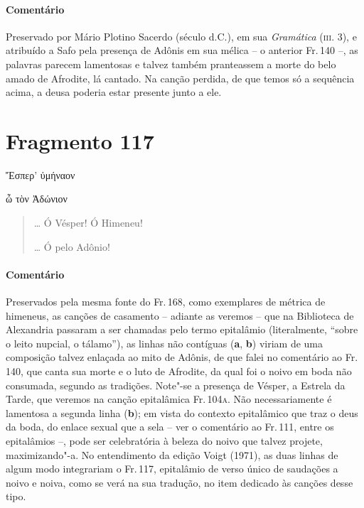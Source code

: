 {\paragraph{Comentário} Preservado por Mário Plotino Sacerdo (século  d.C.), em sua
\emph{Gramática} (\textsc{iii}. 3), e atribuído a Safo pela presença de Adônis em
sua mélica -- o anterior Fr.\,140 --, as palavras parecem lamentosas e
talvez também pranteassem a morte do belo amado de Afrodite, lá cantado. Na canção perdida, de que temos só a sequência acima, a deusa poderia estar presente junto a ele.}


\pagebreak
\section{Fragmento 117}

\begin{gkverse}
 Ἔσπερ’ ὐμήναον

\ast\quad\ast\quad\ast

ὦ τὸν Ἀδώνιον
\end{gkverse}

\begin{verse}
\ldots{} Ó Vésper! Ó Himeneu!

\ast\quad\ast\quad\ast

\ldots{} Ó pelo Adônio!
\end{verse}

{\paragraph{Comentário} Preservados pela mesma fonte do Fr.\,168, como exemplares de métrica de
himeneus, as canções de casamento -- adiante as veremos -- que na
Biblioteca de Alexandria passaram a ser chamadas pelo termo epitalâmio
(literalmente, ``sobre o leito nupcial, o tálamo''), as linhas não contíguas (\textbf{a}, \textbf{b}) viriam de uma composição talvez enlaçada ao mito de Adônis, de que falei no
comentário ao Fr.\,140, que canta sua morte e o luto de Afrodite, da qual foi o noivo em boda não consumada, segundo as tradições. Note"-se
a presença de Vésper, a Estrela da Tarde, que veremos na canção
epitalâmica Fr.\,104\textsc{a}. Não necessariamente é lamentosa a segunda linha
(\textbf{b}); em vista do contexto epitalâmico que traz o deus da boda, do
enlace sexual que a sela -- ver o comentário ao Fr.\,111, entre os
epitalâmios --, pode ser celebratória à beleza do noivo que talvez projete, maximizando"-a. No entendimento da edição Voigt (1971), as duas linhas de algum modo integrariam o Fr.\,117, epitalâmio de verso único de saudações a noivo e noiva, como se verá na sua tradução, no item dedicado às canções desse tipo.}




